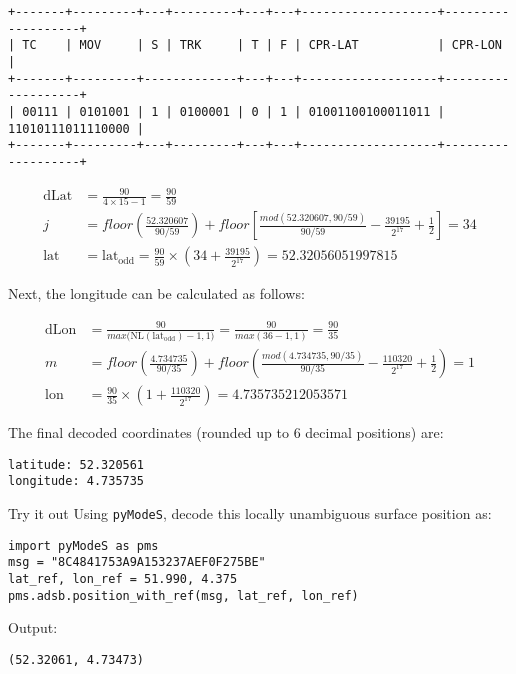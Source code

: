 \begin{verbatim}
+-------+---------+---+---------+---+---+-------------------+-------------------+
| TC    | MOV     | S | TRK     | T | F | CPR-LAT           | CPR-LON           |
+-------+---------+-------------+---+---+-------------------+-------------------+
| 00111 | 0101001 | 1 | 0100001 | 0 | 1 | 01001100100011011 | 11010111011110000 |
+-------+---------+---+---------+---+---+-------------------+-------------------+
\end{verbatim}


\begin{align}
    \mathrm{dLat} &= \frac{90}{4 \times 15 - 1} = \frac{90}{59} \\
    j &= floor \left( \frac{52.320607}{90/59} \right) + floor \left[ \frac{mod(52.320607, 90/59)}{90/59} - \frac{39195}{2^{17}}  + \frac{1}{2} \right] = 34 \\
    \mathrm{lat} &= \mathrm{lat}_\mathrm{odd} = \frac{90}{59} \times \left( 34 + \frac{39195}{2^{17}} \right) = 52.32056051997815
\end{align}
  
Next, the longitude can be calculated as follows:
  
\begin{align}
    \mathrm{dLon} &= \frac{90}{max \Big( \mathrm{NL}(\mathrm{lat}_\mathrm{odd})-1, 1 \Big)} = \frac{90}{max(36-1, 1)} = \frac{90}{35} \\
    m &= floor \left( \frac{4.734735}{90/35} \right) + floor \left( \frac{mod(4.734735, 90/35)}{90/35} - \frac{110320}{2^{17}}  + \frac{1}{2}  \right) = 1 \\
    \mathrm{lon} &= \frac{90}{35} \times \left(1 + \frac{110320}{2^{17}} \right) = 4.735735212053571
\end{align}


The final decoded coordinates (rounded up to 6 decimal positions) are:

\begin{verbatim}
latitude: 52.320561
longitude: 4.735735
\end{verbatim}

\begin{notebox}{Try it out}
Using \texttt{pyModeS}, decode this locally unambiguous surface position as: 

\begin{verbatim}
import pyModeS as pms
msg = "8C4841753A9A153237AEF0F275BE"
lat_ref, lon_ref = 51.990, 4.375
pms.adsb.position_with_ref(msg, lat_ref, lon_ref)
\end{verbatim}

Output: 

\begin{verbatim}
(52.32061, 4.73473)
\end{verbatim}

\end{notebox}


